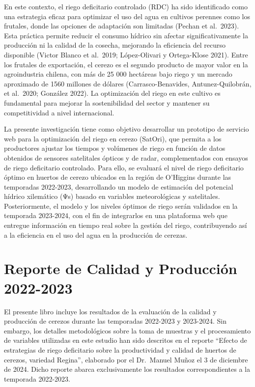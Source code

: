 \documentclass[
  letterpaper,
  DIV=11,
  numbers=noendperiod]{scrreprt}
\begin{document}
En este contexto, el riego deficitario controlado (RDC) ha sido
identificado como una estrategia eficaz para optimizar el uso del agua
en cultivos perennes como los frutales, donde las opciones de adaptación
son limitadas (Pechan et al.~2023). Esta práctica permite reducir el
consumo hídrico sin afectar significativamente la producción ni la
calidad de la cosecha, mejorando la eficiencia del recurso disponible
(Victor Blanco et al.~2019; López-Olivari y Ortega-Klose 2021). Entre
los frutales de exportación, el cerezo es el segundo producto de mayor
valor en la agroindustria chilena, con más de 25 000 hectáreas bajo
riego y un mercado aproximado de 1560 millones de dólares
(Carrasco-Benavides, Antunez-Quilobrán, et al.~2020; González 2022). La
optimización del riego en este cultivo es fundamental para mejorar la
sostenibilidad del sector y mantener su competitividad a nivel
internacional.

La presente investigación tiene como objetivo desarrollar un prototipo
de servicio web para la optimización del riego en cerezo (SatOri), que
permita a los productores ajustar los tiempos y volúmenes de riego en
función de datos obtenidos de sensores satelitales ópticos y de radar,
complementados con ensayos de riego deficitario controlado. Para ello,
se evaluará el nivel de riego deficitario óptimo en huertos de cerezo
ubicados en la región de O'Higgins durante las temporadas 2022-2023,
desarrollando un modelo de estimación del potencial hídrico xilemático
(Ψs) basado en variables meteorológicas y satelitales. Posteriormente,
el modelo y los niveles óptimos de riego serán validados en la temporada
2023-2024, con el fin de integrarlos en una plataforma web que entregue
información en tiempo real sobre la gestión del riego, contribuyendo así
a la eficiencia en el uso del agua en la producción de cerezas.


\chapter*{Reporte de Calidad y Producción
2022-2023}\label{reporte-de-calidad-y-producciuxf3n-2022-2023}


El presente libro incluye los resultados de la evaluación de la calidad
y producción de cerezos durante las temporadas 2022-2023 y 2023-2024.
Sin embargo, los detalles metodológicos sobre la toma de muestras y el
procesamiento de variables utilizadas en este estudio han sido descritos
en el reporte ``Efecto de estrategias de riego deficitario sobre la
productividad y calidad de huertos de cerezos, variedad Regina'',
elaborado por el Dr.~Manuel Muñoz el 3 de diciembre de 2024. Dicho
reporte abarca exclusivamente los resultados correspondientes a la
temporada 2022-2023.
\end{document}
